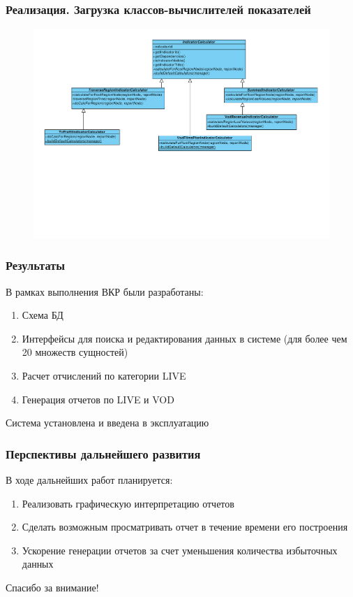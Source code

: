 \documentclass{beamer}
\begin{document}
\begin{frame}[t]
\frametitle{Реализация. Загрузка классов-вычислителей показателей}
\begin{figure}
\begin{center}
\vspace{0cm}
\hspace*{-1cm} \includegraphics[scale=0.43]{../resources/uml/StatReportIndicatorCalculator.pdf}
\end{center}
\end{figure}
\end{frame}

\begin{frame}
\frametitle{Результаты}
В рамках выполнения ВКР были разработаны:
\begin{enumerate}
\item {
Схема БД
}
\item {
Интерфейсы для поиска и редактирования данных в системе (для более чем 20 множеств сущностей)
}
\item {
Расчет отчислений по категории LIVE
}
\item {
Генерация отчетов по LIVE и VOD
}
\end{enumerate}


Система установлена и введена в эксплуатацию

\end{frame}

\begin{frame}
\frametitle{Перспективы дальнейшего развития}
В ходе дальнейших работ планируется:
\begin{enumerate}
\item {
Реализовать графическую интерпретацию отчетов
}
\item {
Сделать возможным просматривать отчет в течение времени его построения
}
\item {
Ускорение генерации отчетов за счет уменьшения количества избыточных данных
}
\end{enumerate}


\end{frame}


\begin{frame}
{\Large Спасибо за внимание!}
\end{frame}
\end{document}
